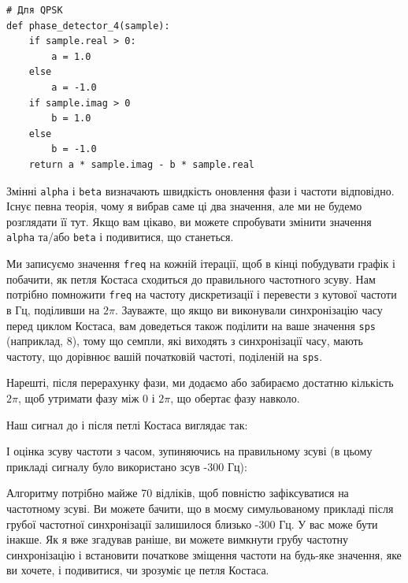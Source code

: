 \begin{Verbatim}[breaklines=true,breakanywhere=true,fontsize=\small]
# Для QPSK
def phase_detector_4(sample):
    if sample.real > 0:
        a = 1.0
    else
        a = -1.0
    if sample.imag > 0
        b = 1.0
    else
        b = -1.0   
    return a * sample.imag - b * sample.real
\end{Verbatim}

Змінні \texttt{alpha} і \texttt{beta} визначають швидкість оновлення
фази і частоти відповідно. Існує певна теорія, чому я вибрав саме ці два
значення, але ми не будемо розглядати її тут. Якщо вам цікаво, ви можете
спробувати змінити значення \texttt{alpha} та/або \texttt{beta} і
подивитися, що станеться.

Ми записуємо значення \texttt{freq} на кожній ітерації, щоб в кінці
побудувати графік і побачити, як петля Костаса сходиться до правильного
частотного зсуву. Нам потрібно помножити \texttt{freq} на частоту
дискретизації і перевести з кутової частоти в Гц, поділивши на \(2\pi\).
Зауважте, що якщо ви виконували синхронізацію часу перед циклом Костаса,
вам доведеться також поділити на ваше значення \texttt{sps} (наприклад,
8), тому що семпли, які виходять з синхронізації часу, мають частоту, що
дорівнює вашій початковій частоті, поділеній на \texttt{sps}.

Нарешті, після перерахунку фази, ми додаємо або забираємо достатню
кількість \(2 \pi\), щоб утримати фазу між 0 і \(2 \pi\), що обертає
фазу навколо.

Наш сигнал до і після петлі Костаса виглядає так:

\href{../_images/costas-loop-output.svg}{}

І оцінка зсуву частоти з часом, зупиняючись на правильному зсуві (в
цьому прикладі сигналу було використано зсув -300 Гц):

\href{../_images/costas-loop-freq-tracking.svg}{}

Алгоритму потрібно майже 70 відліків, щоб повністю зафіксуватися на
частотному зсуві. Ви можете бачити, що в моєму симульованому прикладі
після грубої частотної синхронізації залишилося близько -300 Гц. У вас
може бути інакше. Як я вже згадував раніше, ви можете вимкнути грубу
частотну синхронізацію і встановити початкове зміщення частоти на
будь-яке значення, яке ви хочете, і подивитися, чи зрозуміє це петля
Костаса.

